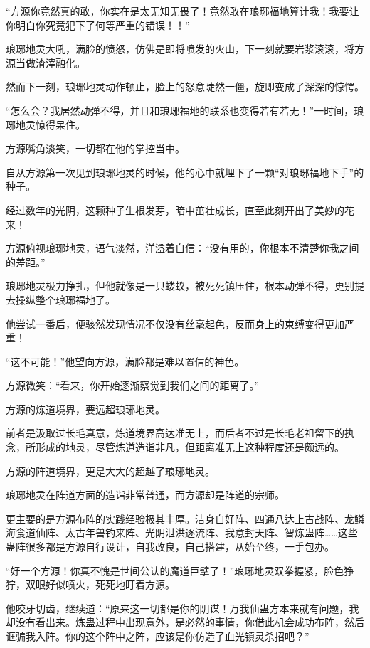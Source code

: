 
\begin{this_body}

“方源你竟然真的敢，你实在是太无知无畏了！竟然敢在琅琊福地算计我！我要让你明白你究竟犯下了何等严重的错误！！”

琅琊地灵大吼，满脸的愤怒，仿佛是即将喷发的火山，下一刻就要岩浆滚滚，将方源当做渣滓融化。

然而下一刻，琅琊地灵动作顿止，脸上的怒意陡然一僵，旋即变成了深深的惊愕。

“怎么会？我居然动弹不得，并且和琅琊福地的联系也变得若有若无！”一时间，琅琊地灵惊得呆住。

方源嘴角淡笑，一切都在他的掌控当中。

自从方源第一次见到琅琊地灵的时候，他的心中就埋下了一颗“对琅琊福地下手”的种子。

经过数年的光阴，这颗种子生根发芽，暗中茁壮成长，直至此刻开出了美妙的花来！

方源俯视琅琊地灵，语气淡然，洋溢着自信：“没有用的，你根本不清楚你我之间的差距。”

琅琊地灵极力挣扎，但他就像是一只蝼蚁，被死死镇压住，根本动弹不得，更别提去操纵整个琅琊福地了。

他尝试一番后，便骇然发现情况不仅没有丝毫起色，反而身上的束缚变得更加严重！

“这不可能！”他望向方源，满脸都是难以置信的神色。

方源微笑：“看来，你开始逐渐察觉到我们之间的距离了。”

方源的炼道境界，要远超琅琊地灵。

前者是汲取过长毛真意，炼道境界高达准无上，而后者不过是长毛老祖留下的执念，所形成的地灵，尽管炼道造诣非凡，但距离准无上这种程度还是颇远的。

方源的阵道境界，更是大大的超越了琅琊地灵。

琅琊地灵在阵道方面的造诣非常普通，而方源却是阵道的宗师。

更主要的是方源布阵的实践经验极其丰厚。洁身自好阵、四通八达上古战阵、龙鳞海食道仙阵、太古年兽钓来阵、光阴泄洪逐流阵、我意封天阵、智炼蛊阵……这些蛊阵很多都是方源自行设计，自我改良，自己搭建，从始至终，一手包办。

“好一个方源！你真不愧是世间公认的魔道巨擘了！”琅琊地灵双拳握紧，脸色狰狞，双眼好似喷火，死死地盯着方源。

他咬牙切齿，继续道：“原来这一切都是你的阴谋！万我仙蛊方本来就有问题，我却没有看出来。炼蛊过程中出现意外，是必然的事情，你借此机会成功布阵，然后诓骗我入阵。你的这个阵中之阵，应该是你仿造了血光镇灵杀招吧？”


\end{this_body}

